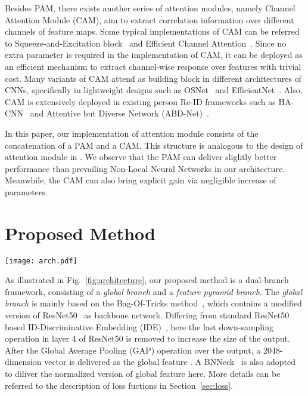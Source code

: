\documentclass[journal]{IEEEtran}
\begin{document}
Besides PAM, there exists another series of attention modules, namely Channel Attention Module (CAM), aim to extract correlation information over different channels of feature maps.
Some typical implementations of CAM can be referred to Squeeze-and-Excitation block~\cite{8701503} and Efficient Channel Attention~\cite{wang2019ecanet}.
Since no extra parameter is required in the implementation of CAM, it can be deployed as an efficient mechanism to extract channel-wise response over features with trivial cost. 
Many variants of CAM attend as building block in different architectures of CNNs, specifically in lightweight designs such as OSNet~\cite{9011001} and EfficientNet~\cite{tan2019efficientnet}.
Also, CAM is extensively deployed in existing person Re-ID frameworks such as HA-CNN~\cite{8578341} and Attentive but Diverse Network (ABD-Net)~\cite{chen2019ABD}.

In this paper, our implementation of attention module consists of the concatenation of a PAM and a CAM.
This structure is analogous to the design of attention module in \cite{chen2019ABD}.
We observe that the PAM can deliver slightly better performance than prevailing Non-Local Neural Networks in our architecture.
Meanwhile, the CAM can also bring explicit gain via negligible increase of parameters. 

\section{Proposed Method}
\begin{figure*}
\begin{center}
  \centerline{\texttt{[image: arch.pdf]}}
  \caption{The overall architecture of our proposed method.
  Here the stride of the last down-sampling layer is changed from 2 to 1 and denoted as last stride=1.
  The residual structure in FPB is illustrated as curved arrows here.}
  \label{fig:architecture}
  \end{center}
\end{figure*}

As illustrated in Fig.~\ref{fig:architecture}, our proposed method is a dual-branch framework, consisting of a \textit{global branch} and a \textit{feature pyramid branch}.
The \textit{global branch} is mainly based on the Bag-Of-Tricks method~\cite{luo2019bag}, which contains a modified version of ResNet50~\cite{he2016deep} as backbone network.
Differing from standard ResNet50 based ID-Discriminative Embedding (IDE)~\cite{zheng2016person}, here the last down-sampling operation in layer 4 of ResNet50 is removed to increase the size of the output.
After the Global Average Pooling (GAP) operation over the output, a 2048-dimension vector is delivered as the global feature .
A BNNeck~\cite{luo2019bag} is also adopted to diliver the normalized version of global feature  here.
More details can be referred to the description of loss fuctions in Section~\ref{sec:loss}.
\end{document}
